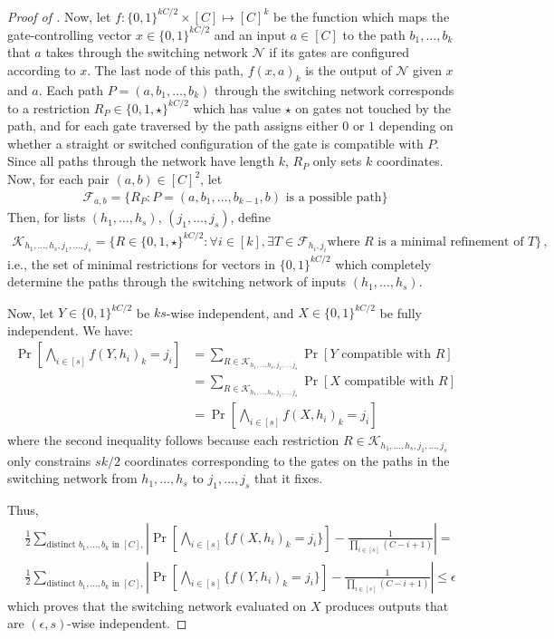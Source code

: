 \documentclass[10pt]{article}
\theoremstyle{definition}\newtheorem{definition}[lemma]{Definition}
\theoremstyle{remark}  \newtheorem*{remark}{Remark}
\newcommand{\cF}{\mathcal{F}}
\newcommand{\cK}{\mathcal{K}}
\newcommand{\cN}{\mathcal{N}}
\begin{document}
\begin{proof}[Proof of ]
  Now, let $f : \{0,1\}^{k C/2} \times [C] \mapsto [C]^k$ be the function which maps the gate-controlling vector $x \in \{0,1\}^{k C / 2}$ and an input $a \in [C]$ to the path $b_1,\ldots,b_k$ that $a$ takes through the switching network $\cN$ if its gates are configured according to $x$. The last node of this path, $f(x, a)_k$ is the output of $\cN$ given $x$ and $a$. Each path $P = (a,b_1,\ldots,b_k)$ through the switching network corresponds to a restriction $R_P \in \{0,1,\star\}^{k C / 2}$ which has value $\star$ on gates not touched by the path, and for each gate traversed by the path assigns either $0$ or $1$ depending on whether a straight or switched configuration of the gate is compatible with $P$. Since all paths through the network have length $k$, $R_P$ only sets $k$ coordinates. Now, for each pair $(a,b) \in [C]^2$, let 
  \begin{align*}
    \cF_{a,b} = \{R_P : P = (a,b_1,\ldots,b_{k-1},b) \text{ is a possible path}\}
  \end{align*}
  Then, for lists $(h_1,\ldots,h_s)$, $(j_1,\ldots,j_s)$, define 
  \begin{align*}
    \cK_{h_1,\ldots,h_s,j_1,\ldots,j_s} = \{ R \in \{0,1,\star\}^{k C / 2} : \forall i \in [k], \exists T \in \cF_{h_i,j_i} \text{where $R$ is a minimal refinement of $T$}  \}\,,
  \end{align*}
  i.e., the set of minimal restrictions for vectors in $\{0,1\}^{k C / 2}$ which
  completely determine the paths through the switching network of inputs $(h_1,\ldots,h_s)$. 
  
  Now, let $Y \in \{0,1\}^{k C / 2}$ be $k s$-wise independent, and $X \in \{0,1\}^{k C / 2}$ be fully independent. We have:
  \begin{align*}
    \Pr[\bigwedge_{i\in[s]} f(Y, h_i)_k = j_i] &= \sum_{R \in \cK_{h_1,\ldots,h_s,j_1,\ldots,j_s}} \Pr[Y \text{ compatible with $R$}] \\
    &= \sum_{R \in \cK_{h_1,\ldots,h_s,j_1,\ldots,j_s}} \Pr[X \text{ compatible with $R$}] \\
    &= \Pr[\bigwedge_{i\in[s]} f(X, h_i)_k = j_i]
  \end{align*}
  where the second inequality follows because each restriction $R \in \cK_{h_1,\ldots,h_s,j_1,\ldots,j_s}$ only constrains $s k / 2$ coordinates
  corresponding to the gates on the paths in the switching network from $h_1,\ldots,h_s$ to $j_1,\ldots,j_s$ that it fixes.
  
  Thus,
  \begin{align*}
      &\frac{1}{2} \sum_{\text{distinct $b_1,\ldots,b_k$ in $[C]$,}} \left| \Pr\left[\bigwedge_{i \in [s]} \{ f(X, h_i)_k = j_i \} \right] - \frac{1}{\prod_{i \in [s]} (C - i + 1)} \right| = \\
      &\frac{1}{2} \sum_{\text{distinct $b_1,\ldots,b_k$ in $[C]$,}} \left| \Pr\left[\bigwedge_{i \in [s]} \{ f(Y, h_i)_k = j_i \} \right] - \frac{1}{\prod_{i \in [s]} (C - i + 1)} \right| \le \epsilon
  \end{align*}
  which proves that the switching network evaluated on $X$ produces outputs that are $(\epsilon,s)$-wise independent.
\end{proof}
\end{document}

